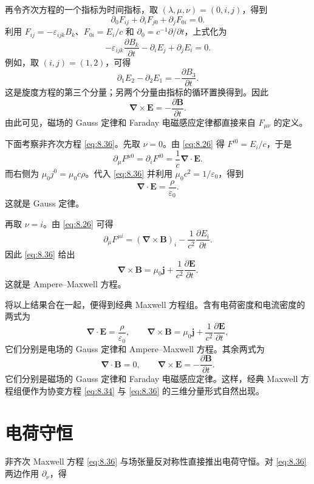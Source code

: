 再令齐次方程的一个指标为时间指标，取
$(\lambda,\mu,\nu)=(0,i,j)$，得到
\[
\partial_{0}F_{ij}
+
\partial_{i}F_{j0}
+
\partial_{j}F_{0i}
=0.
\]
利用 $F_{ij}=-\varepsilon_{ijk}B_{k}$、$F_{0i}=E_{i}/c$ 和
$\partial_{0}=c^{-1}\partial/\partial t$，上式化为
\[
-\varepsilon_{ijk}\frac{\partial B_{k}}{\partial t}
-\partial_{i}E_{j}
+\partial_{j}E_{i}
=0.
\]
例如，取 $(i,j)=(1,2)$，可得
\[
\partial_{1}E_{2}-\partial_{2}E_{1}
=
-\frac{\partial B_{3}}{\partial t}.
\]
这是旋度方程的第三个分量；另两个分量由指标的循环置换得到。因此
\[
\bm{\nabla}\times\bm{E}
=
-\frac{\partial\bm{B}}{\partial t}.
\]
由此可见，磁场的 Gauss 定律和 Faraday 电磁感应定律都直接来自
$F_{\mu\nu}$ 的定义。

下面考察非齐次方程 \eqref{eq:8.36}。先取 $\nu=0$。由
\eqref{eq:8.26} 得 $F^{i0}=E_{i}/c$，于是
\[
\partial_{\mu}F^{\mu0}
=
\partial_{i}F^{i0}
=
\frac{1}{c}\bm{\nabla}\cdot\bm{E}.
\]
而右侧为 $\mu_{0}j^{0}=\mu_{0}c\rho$。代入 \eqref{eq:8.36} 并利用 $\mu_{0}c^{2}=1/\varepsilon_{0}$，得到
\[
\bm{\nabla}\cdot\bm{E}
=
\frac{\rho}{\varepsilon_{0}}.
\]
这就是 Gauss 定律。

再取 $\nu=i$。由 \eqref{eq:8.26} 可得
\[
\partial_{\mu}F^{\mu i}
=
(\bm{\nabla}\times\bm{B})_{i}
-
\frac{1}{c^{2}}\frac{\partial E_{i}}{\partial t}.
\]
因此 \eqref{eq:8.36} 给出
\[
\bm{\nabla}\times\bm{B}
=
\mu_{0}\bm{j}
+
\frac{1}{c^{2}}\frac{\partial\bm{E}}{\partial t}.
\]
这就是 Ampere--Maxwell 方程。

将以上结果合在一起，便得到经典 Maxwell 方程组。含有电荷密度和电流密度的两式为
\begin{equation}
	\bm{\nabla}\cdot\bm{E}
	=
	\frac{\rho}{\varepsilon_{0}},
	\qquad
	\bm{\nabla}\times\bm{B}
	=
	\mu_{0}\bm{j}
	+
	\frac{1}{c^{2}}\frac{\partial\bm{E}}{\partial t},
	\label{eq:8.41}
\end{equation}
它们分别是电场的 Gauss 定律和 Ampere--Maxwell 方程。其余两式为
\begin{equation}
	\bm{\nabla}\cdot\bm{B}=0,
	\qquad
	\bm{\nabla}\times\bm{E}
	=
	-
	\frac{\partial\bm{B}}{\partial t}.
	\label{eq:8.42}
\end{equation}
它们分别是磁场的 Gauss 定律和 Faraday 电磁感应定律。这样，经典
Maxwell 方程组便作为协变方程 \eqref{eq:8.34} 与 \eqref{eq:8.36}
的三维分量形式自然出现。

\section{电荷守恒}

非齐次 Maxwell 方程 \eqref{eq:8.36} 与场张量反对称性直接推出电荷守恒。对 \eqref{eq:8.36} 两边作用 $\partial_{\nu}$，得

